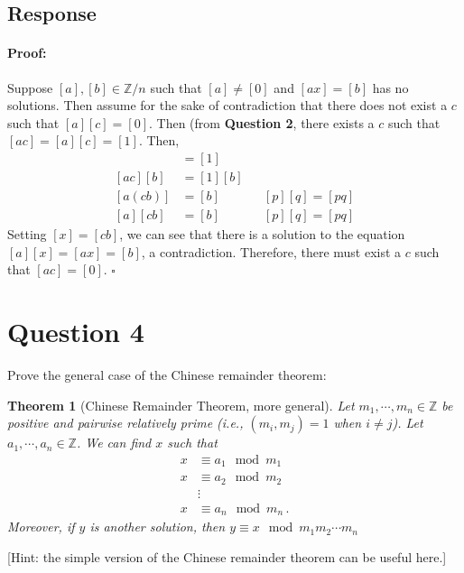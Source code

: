 \documentclass [12pt] {article}
\newtheorem{theorem}{Theorem}
\newcommand{\Z}{\mathbb{Z}}
\newenvironment{proof}{\paragraph{Proof:}}{\hfill$\square$}
\begin{document}
\subsection*{Response}
\begin{proof}
    Suppose $[a], [b] \in \Z/n$ such that $[a] \neq [0]$ and $[ax] = [b]$ has no solutions. Then
    assume for the sake of contradiction that there does not exist a $c$ such that $[a][c] = [0]$.
    Then (from \textbf{Question 2}, there exists a $c$ such that $[ac] = [a][c] = [1]$. Then,
    \begin{align*}
        [ac] &= [1] \\
        [ac][b] &= [1][b] \\
        [a(cb)] &= [b] && [p][q] = [pq] \\
        [a][cb] &= [b] && [p][q] = [pq]
    \end{align*}
    Setting $[x] = [cb]$, we can see that there is a solution to the equation $[a][x] = [ax] = [b]$, 
    a contradiction. Therefore, there must exist a $c$ such that $[ac] = [0]$.
\end{proof}
\newpage

\section*{Question 4}
Prove the general case of the Chinese remainder theorem: 

\begin{theorem}[Chinese Remainder Theorem, more general]
    Let $m_1,\cdots,m_n\in\Z$ be positive and pairwise relatively prime (i.e., $(m_i,m_j)=1$ when $i\neq j$). Let $a_1,\cdots,a_n\in \Z$. We can find $x$ such that 
    \begin{align*}
        x &\equiv a_1\mod m_1 \\
        x &\equiv a_2\mod m_2 \\
        &\vdots \\
        x &\equiv a_n\mod m_n\,.
    \end{align*}
    Moreover, if $y$ is another solution, then $y\equiv x\mod m_1m_2\cdots m_n$
\end{theorem}
[Hint: the simple version of the Chinese remainder theorem can be useful here.]
\end{document}
